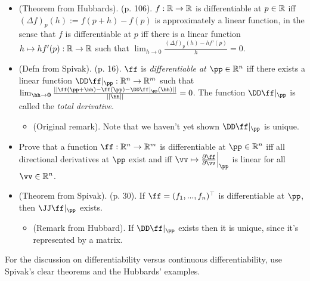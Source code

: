 \begin{itemize}
    \item (Theorem from Hubbards). (p. 106). $f: \mathbb{R} \rightarrow \mathbb{R}$ is differentiable at $p \in \mathbb{R}$ iff $(\Delta f)_p(h) := f(p + h) - f(p)$ is approximately a linear function, in the sense that $f$ is differentiable at $p$ iff there is a linear function $h \mapsto hf'(p):\mathbb{R} \rightarrow \mathbb{R}$ such that $\lim_{h \rightarrow 0} \frac{(\Delta f)_p(h) - hf'(p)}{h} = 0$.
    \item (Defn from Spivak). (p. 16). $\ff$ is \textit{differentiable at $\pp \in \R^n$} iff there exists a linear function $\DD \ff|_\pp:\R^n \rightarrow \R^m$ such that $\lim_{\hh \rightarrow \mathbf{0}} \frac{||\ff(\pp + \hh) - \ff(\pp) - \DD \ff|_\pp(\hh)||}{||\hh||} = 0$. The function $\DD \ff|_\pp$ is called the \textit{total derivative}.
    \begin{itemize}
        \item (Original remark). Note that we haven't yet shown $\DD \ff|_\pp$ is unique.
    \end{itemize}
    
    \item Prove that a function $\ff:\R^n \rightarrow \R^m$ is differentiable at $\pp \in \R^n$ iff all directional derivatives at $\pp$ exist and iff $\vv \mapsto \frac{\pd \ff}{\pd \vv}\Big|_\pp$ is linear for all $\vv \in \R^n$.
    \item (Theorem from Spivak). (p. 30). If $\ff = (f_1, ..., f_n)^\top$ is differentiable at $\pp$, then $\JJ \ff|_\pp$ exists.
    \begin{itemize}
        \item (Remark from Hubbard). If $\DD \ff|_\pp$ exists then it is unique, since it's represented by a matrix.
    \end{itemize}
\end{itemize}


For the discussion on differentiability versus continuous differentiability, use Spivak's clear theorems and the Hubbards' examples.

